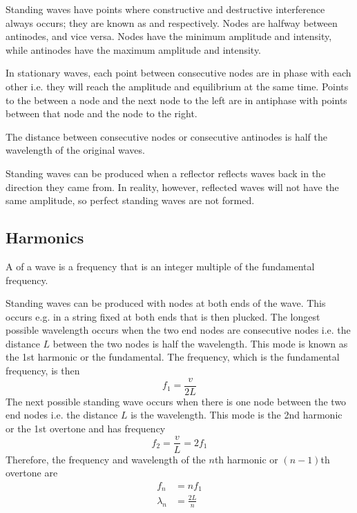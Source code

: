 \documentclass[Physics.tex]{subfiles}
\begin{document}
Standing waves have points where constructive and destructive interference always occurs; they are known as  and  respectively. Nodes are halfway between antinodes, and vice versa. Nodes have the minimum amplitude and intensity, while antinodes have the maximum amplitude and intensity.

In stationary waves, each point between consecutive nodes are in phase with each other i.e. they will reach the amplitude and equilibrium at the same time. Points to the between a node and the next node to the left are in antiphase with points between that node and the node to the right.

The distance between consecutive nodes or consecutive antinodes is half the wavelength of the original waves.

Standing waves can be produced when a reflector reflects waves back in the direction they came from. In reality, however, reflected waves will not have the same amplitude, so perfect standing waves are not formed.
%
\subsection{Harmonics}
A  of a wave is a frequency that is an integer multiple of the fundamental frequency.

Standing waves can be produced with nodes at both ends of the wave. This occurs e.g. in a string fixed at both ends that is then plucked. The longest possible wavelength occurs when the two end nodes are consecutive nodes i.e. the distance \(L\) between the two nodes is half the wavelength. This mode is known as the 1st harmonic or the fundamental. The frequency, which is the fundamental frequency, is then \[f_1 = \frac{v}{2L}\] The next possible standing wave occurs when there is one node between the two end nodes i.e. the distance \(L\) is the wavelength. This mode is the 2nd harmonic or the 1st overtone and has frequency \[f_2 = \frac{v}{L} = 2f_1\] Therefore, the frequency and wavelength of the \(n\)th harmonic or \((n-1)\)th overtone are \begin{align*}f_n &= nf_1\\\lambda_n &= \frac{2L}{n}\end{align*}
\end{document}

